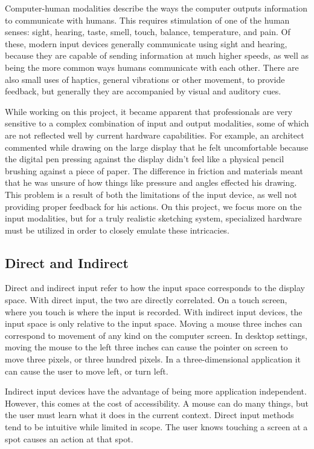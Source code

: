 \documentclass[11pt]{report}
\begin{document}
Computer-human modalities describe the ways the computer outputs information to communicate with humans.
This requires stimulation of one of the human senses: sight, hearing, taste, smell, touch, balance, temperature, and pain. 
Of these, modern input devices generally communicate using sight and hearing, because they are capable of sending information at much higher speeds, as well as being the more common ways humans communicate with each other.
There are also small uses of haptics, general vibrations or other movement, to provide feedback, but generally they are accompanied by visual and auditory cues.

While working on this project, it became apparent that professionals are very sensitive to a complex combination of input and output modalities, some of which are not reflected well by current hardware capabilities. 
For example, an architect commented while drawing on the large display that he felt uncomfortable because the digital pen pressing against the display didn't feel like a physical pencil brushing against a piece of paper. 
The difference in friction and materials meant that he was unsure of how things like pressure and angles effected his drawing.
This problem is a result of both the limitations of the input device, as well not providing proper feedback for his actions.
On this project, we focus more on the input modalities, but for a truly realistic sketching system, specialized hardware must be utilized in order to closely emulate these intricacies.

\subsection{Direct and Indirect}
Direct and indirect input refer to how the input space corresponds to the display space. 
With direct input, the two are directly correlated. 
On a touch screen, where you touch is where the input is recorded. 
With indirect input devices, the input space is only relative to the input space. Moving a mouse three inches can correspond to movement of any kind on the computer screen. 
In desktop settings, moving the mouse to the left three inches can cause the pointer on screen to move three pixels, or three hundred pixels. 
In a three-dimensional application it can cause the user to move left, or turn left.

Indirect input devices have the advantage of being more application independent. However, this comes at the cost of accessibility. 
A mouse can do many things, but the user must learn what it does in the current context. 
Direct input methods tend to be intuitive while limited in scope. 
The user knows touching a screen at a spot causes an action at that spot.
\end{document}
